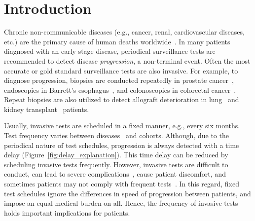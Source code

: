 \section{Introduction}
\label{sec:introduction}
Chronic non-communicable diseases (e.g., cancer, renal, cardiovascular diseases, etc.) are the primary cause of human deaths worldwide~\citep{alwan2010monitoring}. In many patients diagnosed with an early stage disease, periodical surveillance tests are recommended to detect disease \textit{progression}, a non-terminal event. Often the most accurate or gold standard surveillance tests are also invasive. For example, to diagnose progression, biopsies are conducted repeatedly in prostate cancer~\citep{bokhorst2015compliance}, endoscopies in Barrett's esophagus~\citep{streitz1993endoscopic}, and colonoscopies in colorectal cancer~\citep{krist2007timing}. Repeat biopsies are also utilized to detect allograft deterioration in lung~\citep{mcwilliams2008surveillance} and kidney transplant~\citep{henderson2011surveillance} patients.

Usually, invasive tests are scheduled in a fixed manner, e.g., every six months. Test frequency varies between diseases~\citep{henderson2011surveillance,bokhorst2015compliance,krist2007timing} and cohorts. Although, due to the periodical nature of test schedules, progression is always detected with a time delay (Figure~\ref{fig:delay_explanation}). This time delay can be reduced by scheduling invasive tests frequently. However, invasive tests are difficult to conduct, can lead to severe complications~\citep{loeb2013systematic,krist2007timing}, cause patient discomfort, and sometimes patients may not comply with frequent tests~\citep{bokhorst2015compliance}. In this regard, fixed test schedules ignore the differences in speed of progression between patients, and impose an equal medical burden on all. Hence, the frequency of invasive tests holds important implications for patients.

